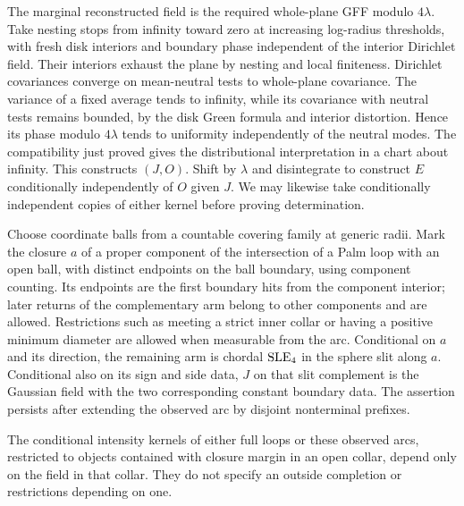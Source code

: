 The marginal reconstructed field is the required whole-plane GFF modulo $4\lambda$.  Take nesting stops from infinity toward zero at increasing log-radius thresholds, with fresh disk interiors and boundary phase independent of the interior Dirichlet field.  Their interiors exhaust the plane by nesting and local finiteness.  Dirichlet covariances converge on mean-neutral tests to whole-plane covariance.  The variance of a fixed average tends to infinity, while its covariance with neutral tests remains bounded, by the disk Green formula and interior distortion.  Hence its phase modulo $4\lambda$ tends to uniformity independently of the neutral modes.  The compatibility just proved gives the distributional interpretation in a chart about infinity.  This constructs $(J,O)$.  Shift by $\lambda$ and disintegrate to construct $E$ conditionally independently of $O$ given $J$.  We may likewise take conditionally independent copies of either kernel before proving determination.

\begin{lemma}\label{wall:arc-palm}
Choose coordinate balls from a countable covering family at generic radii.  Mark the closure $a$ of a proper component of the intersection of a Palm loop with an open ball, with distinct endpoints on the ball boundary, using component counting. Its endpoints are the first boundary hits from the component interior; later returns of the complementary arm belong to other components and are allowed.  Restrictions such as meeting a strict inner collar or having a positive minimum diameter are allowed when measurable from the arc.  Conditional on $a$ and its direction, the remaining arm is chordal $\mathrm{SLE}_4$ in the sphere slit along $a$.  Conditional also on its sign and side data, $J$ on that slit complement is the Gaussian field with the two corresponding constant boundary data.  The assertion persists after extending the observed arc by disjoint nonterminal prefixes.

The conditional intensity kernels of either full loops or these observed arcs, restricted to objects contained with closure margin in an open collar, depend only on the field in that collar.  They do not specify an outside completion or restrictions depending on one.
\end{lemma}

